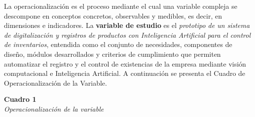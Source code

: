 \documentclass[12pt, letterpaper]{report}
\begin{document}
La operacionalización es el proceso mediante el cual una variable
compleja se descompone en conceptos concretos, observables y medibles,
es decir, en dimensiones e indicadores. La \textbf{variable de estudio}
es el \textit{prototipo de un sistema de digitalización y registros de
productos con Inteligencia Artificial para el control de inventarios},
entendida como el conjunto de necesidades, componentes de diseño,
módulos desarrollados y criterios de cumplimiento que permiten
automatizar el registro y el control de existencias de la empresa
mediante visión computacional e Inteligencia Artificial. A continuación
se presenta el Cuadro de Operacionalización de la Variable.

\vspace{12pt}

\noindent\textbf{Cuadro 1}\\
\textit{Operacionalización de la variable}
\vspace{4pt}
\end{document}
